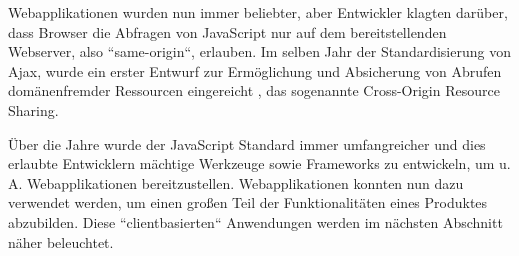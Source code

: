 Webapplikationen wurden nun immer beliebter, aber Entwickler klagten darüber, dass Browser die Abfragen von JavaScript nur auf dem bereitstellenden Webserver, also ``same-origin``, erlauben\cite{CrossSiteXHRWithCORS}. Im selben Jahr der Standardisierung von Ajax, wurde ein erster Entwurf zur Ermöglichung und Absicherung von Abrufen domänenfremder Ressourcen eingereicht \cite{AuthorizingCORS}, das sogenannte Cross-Origin Resource Sharing.

Über die Jahre wurde der JavaScript Standard immer umfangreicher und dies erlaubte Entwicklern mächtige Werkzeuge sowie Frameworks zu entwickeln, um u. A. Webapplikationen bereitzustellen. Webapplikationen konnten nun dazu verwendet werden, um einen großen Teil der Funktionalitäten eines Produktes abzubilden. Diese ``clientbasierten`` Anwendungen werden im nächsten Abschnitt näher beleuchtet.


%

